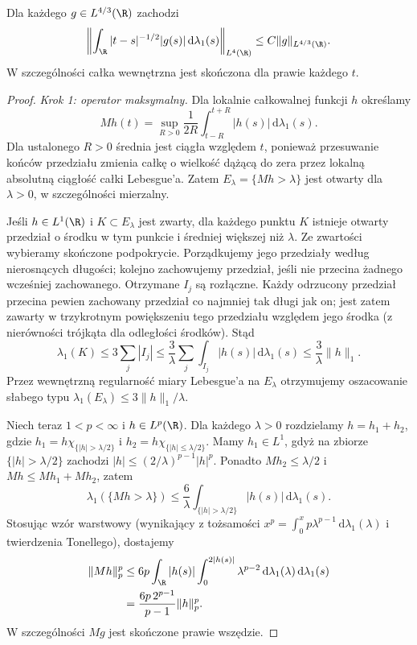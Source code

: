 \begin{lemat}\label{lem:pde22-hls}
Dla każdego $g\in L^{4/3}(\R)$ zachodzi
\begin{equation}\label{eq:pde22-hls}
 \left\|\int_{\R}|t-s|^{-1/2}|g(s)|\,\mathrm d\lambda_1(s)
 \right\|_{L^4(\R)}\le C\|g\|_{L^{4/3}(\R)}.
\end{equation}
W szczególności całka wewnętrzna jest skończona
dla prawie każdego $t$.
\end{lemat}
\begin{proof}
\emph{Krok 1: operator maksymalny.}
Dla lokalnie całkowalnej funkcji $h$ określamy
\[
 Mh(t)=\sup_{R>0}\frac{1}{2R}
         \int_{t-R}^{t+R}|h(s)|\,\mathrm d\lambda_1(s).
\]
Dla ustalonego $R>0$ średnia jest ciągła względem
$t$, ponieważ przesuwanie końców przedziału
zmienia całkę o wielkość dążącą do zera przez
lokalną absolutną ciągłość całki Lebesgue'a.
Zatem $E_\lambda=\{Mh>\lambda\}$ jest otwarty
dla $\lambda>0$, w szczególności mierzalny.

Jeśli $h\in L^1(\R)$ i $K\subset E_\lambda$ jest
zwarty, dla każdego punktu $K$ istnieje otwarty
przedział o środku w tym punkcie i średniej
większej niż $\lambda$. Ze zwartości wybieramy
skończone podpokrycie. Porządkujemy jego przedziały
według nierosnących długości; kolejno zachowujemy
przedział, jeśli nie przecina żadnego wcześniej
zachowanego. Otrzymane $I_j$ są rozłączne.
Każdy odrzucony przedział przecina pewien
zachowany przedział co najmniej tak długi jak on;
jest zatem zawarty w trzykrotnym powiększeniu
tego przedziału względem jego środka
(z nierówności trójkąta dla odległości środków).
Stąd
\[
 \lambda_1(K)\le3\sum_j|I_j|
 \le\frac{3}{\lambda}\sum_j\int_{I_j}|h(s)|
                      \,\mathrm d\lambda_1(s)
 \le\frac{3}{\lambda}\|h\|_1 .
\]
Przez wewnętrzną regularność miary Lebesgue'a
na $E_\lambda$ otrzymujemy oszacowanie słabego typu
$\lambda_1(E_\lambda)\le3\|h\|_1/\lambda$.

Niech teraz $1<p<\infty$ i $h\in L^p(\R)$.
Dla każdego $\lambda>0$ rozdzielamy $h=h_1+h_2$,
gdzie $h_1=h\chi_{\{|h|>\lambda/2\}}$ i
$h_2=h\chi_{\{|h|\le\lambda/2\}}$.
Mamy $h_1\in L^1$, gdyż na zbiorze
$\{|h|>\lambda/2\}$ zachodzi
$|h|\le(2/\lambda)^{p-1}|h|^p$.
Ponadto $Mh_2\le\lambda/2$ i
$Mh\le Mh_1+Mh_2$, zatem
\[
 \lambda_1(\{Mh>\lambda\})
 \le\frac{6}{\lambda}
       \int_{\{|h|>\lambda/2\}}|h(s)|\,\mathrm d\lambda_1(s).
\]
Stosując wzór warstwowy (wynikający z tożsamości
$x^p=\int_0^x p\lambda^{p-1}\,\mathrm d\lambda_1(\lambda)$
i twierdzenia Tonellego), dostajemy
\[
 \begin{split}
 \|Mh\|_p^p
 &\le6p\int_\R |h(s)|
         \int_0^{2|h(s)|}\lambda^{p-2}
                \,\mathrm d\lambda_1(\lambda)\,\mathrm d\lambda_1(s)\\
 &=\frac{6p\,2^{p-1}}{p-1}\|h\|_p^p .
 \end{split}
\]
W szczególności $Mg$ jest skończone prawie wszędzie.


\end{proof}
